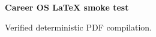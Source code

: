 \documentclass[10pt]{article}
\begin{document}
\textbf{Career OS LaTeX smoke test}

Verified deterministic PDF compilation.
\end{document}
